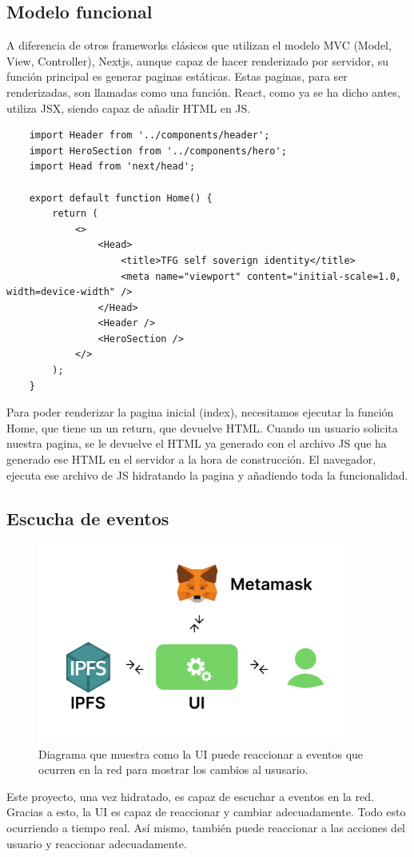 \subsection{Modelo funcional}
A diferencia de otros frameworks clásicos que utilizan el modelo MVC (Model, View, Controller), Nextjs, aunque capaz de hacer renderizado por servidor, su función principal es generar paginas estáticas. Estas paginas, para ser renderizadas, son llamadas como una función. React, como ya se ha dicho antes, utiliza JSX, siendo capaz de añadir HTML en JS.
\begin{lstlisting}
    import Header from '../components/header';
    import HeroSection from '../components/hero';
    import Head from 'next/head';

    export default function Home() {
        return (
            <>
                <Head>
                    <title>TFG self soverign identity</title>
                    <meta name="viewport" content="initial-scale=1.0, width=device-width" />
                </Head>
                <Header />
                <HeroSection />
            </>
        );
    }
\end{lstlisting}
Para poder renderizar la pagina inicial (index), necesitamos ejecutar la función Home, que tiene un un return, que devuelve HTML.
Cuando un usuario solicita nuestra pagina, se le devuelve el HTML ya generado con el archivo JS que ha generado ese HTML en el servidor a la hora de construcción. El navegador, ejecuta ese archivo de JS hidratando la pagina y añadiendo toda la funcionalidad.
\subsection{Escucha de eventos}
\begin{figure}[h!]
    \centering
    \includegraphics[width=0.9\textwidth]{Figures/Reactividad.png}
    \caption{Diagrama que muestra como la UI puede reaccionar a eventos que ocurren en la red para mostrar los cambios al ususario.}
\end{figure}
Este proyecto, una vez hidratado, es capaz de escuchar a eventos en la red. Gracias a esto, la UI es capaz de reaccionar y cambiar adecuadamente. Todo esto ocurriendo a tiempo real. Así mismo, también puede reaccionar a las acciones del usuario y reaccionar adecuadamente.
